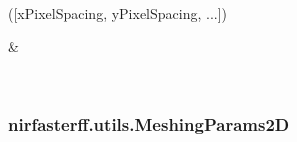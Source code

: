 \documentclass[letterpaper,10pt,english]{sphinxmanual}
\begin{document}
\begin{fulllineitems}
\begin{savenotes}
\begin{longtable}{}
\sphinxbottomrule
{}\\
\endfoot

\endlastfoot
\sphinxtableatstartofbodyhook
\begin{varwidth}[t]{}
\sphinxAtStartPar
{\hyperref[\detokenize{_autosummary/nirfasterff.utils.MeshingParams:nirfasterff.utils.MeshingParams.__init__}]{}}({[}xPixelSpacing, yPixelSpacing, ...{]})
\sphinxbeforeendvarwidth
\end{varwidth}%
&\begin{varwidth}[t]{}
\sphinxAtStartPar

\sphinxbeforeendvarwidth
\end{varwidth}%
\\
\sphinxbottomrule
\end{longtable}
\sphinxtableafterendhook
\sphinxatlongtableend
\end{savenotes}

\end{fulllineitems}


\sphinxstepscope


\subsubsection{nirfasterff.utils.MeshingParams2D}
\label{\detokenize{_autosummary/nirfasterff.utils.MeshingParams2D:nirfasterff-utils-meshingparams2d}}\label{\detokenize{_autosummary/nirfasterff.utils.MeshingParams2D::doc}}
\end{document}
